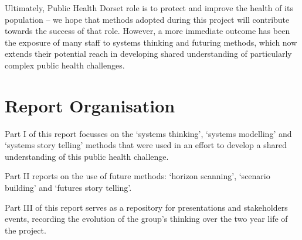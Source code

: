 Ultimately, Public Health Dorset role is to protect and improve the health of its population -- we hope that methods adopted during this project will contribute towards the success of that role. However, a more immediate outcome has been the exposure of many staff to systems thinking and futuring methods, which now extends their potential reach in developing shared understanding of particularly complex public health challenges.

\section{Report Organisation}

Part I of this report focusses on the `systems thinking', `systems modelling' and `systems story telling' methods that were used in an effort to develop a shared understanding of this public health challenge.

Part II reports on the use of future methods: `horizon scanning', `scenario building' and `futures story telling'.

Part III of this report serves as a repository for presentations and stakeholders events, recording the evolution of the group's thinking over the two year life of the project.